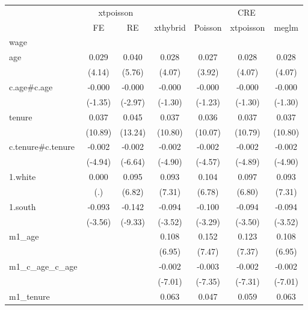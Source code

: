 
\begin{tabular}{l*{6}{c}}
\hline\hline
            &\multicolumn{2}{c}{xtpoisson} & & \multicolumn{3}{c}{CRE}\\
            &{FE}&{RE}&{xthybrid}&{Poisson}&{xtpoisson}&{meglm}\\
\hline
wage        &            &            &            &            &            &            \\
age         &       0.029&       0.040&       0.028&       0.027&       0.028&       0.028\\
            &      (4.14)&      (5.76)&      (4.07)&      (3.92)&      (4.07)&      (4.07)\\
c.age\#c.age &      -0.000&      -0.000&      -0.000&      -0.000&      -0.000&      -0.000\\
            &     (-1.35)&     (-2.97)&     (-1.30)&     (-1.23)&     (-1.30)&     (-1.30)\\
tenure      &       0.037&       0.045&       0.037&       0.036&       0.037&       0.037\\
            &     (10.89)&     (13.24)&     (10.80)&     (10.07)&     (10.79)&     (10.80)\\
c.tenure\#c.tenure&      -0.002&      -0.002&      -0.002&      -0.002&      -0.002&      -0.002\\
            &     (-4.94)&     (-6.64)&     (-4.90)&     (-4.57)&     (-4.89)&     (-4.90)\\
1.white     &       0.000&       0.095&       0.093&       0.104&       0.097&       0.093\\
            &         (.)&      (6.82)&      (7.31)&      (6.78)&      (6.80)&      (7.31)\\
1.south     &      -0.093&      -0.142&      -0.094&      -0.100&      -0.094&      -0.094\\
            &     (-3.56)&     (-9.33)&     (-3.52)&     (-3.29)&     (-3.50)&     (-3.52)\\
m1\_age      &            &            &       0.108&       0.152&       0.123&       0.108\\
            &            &            &      (6.95)&      (7.47)&      (7.37)&      (6.95)\\
m1\_c\_age\_c\_age&            &            &      -0.002&      -0.003&      -0.002&      -0.002\\
            &            &            &     (-7.01)&     (-7.35)&     (-7.31)&     (-7.01)\\
m1\_tenure   &            &            &       0.063&       0.047&       0.059&       0.063\\

\end{tabular}

